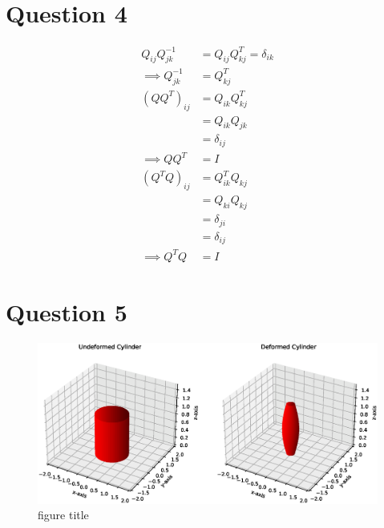 \documentclass[a4paper,12pt]{article} %
\begin{document}
\newpage
\section{\textbf{Question 4}}
\begin{align*}
    Q_{ij} Q^{-1}_{jk} &= Q_{ij} Q^T_{kj} = \delta_{ik} \\
    \implies Q^{-1}_{jk} &= Q^T_{kj}\\
    (QQ^T)_{ij} &= Q_{ik} Q^T_{kj} \\
&= Q_{ik} Q_{jk} \\
&= \delta_{ij} \\
\implies QQ^T &= I\\
(Q^TQ)_{ij} &= Q^T_{ik} Q_{kj} \\
&= Q_{ki} Q_{kj} \\
&= \delta_{ji} \\
&= \delta_{ij} \\
\implies Q^TQ &= I
\end{align*}

\newpage
\section{\textbf{Question 5}}
\begin{figure}[htbp]
    \includegraphics[scale=0.5]{MECH503HW1Q5.eps}
    \caption{figure title}
    \label{figure}
\end{figure}
\end{document}

